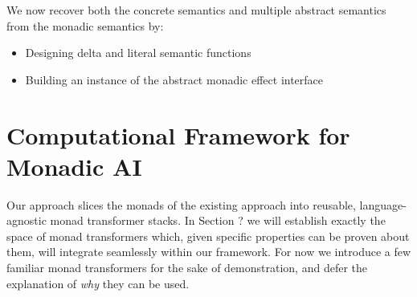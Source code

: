\documentclass{article}
\begin{document}
We now recover both the concrete semantics and multiple abstract semantics from
the monadic semantics by:
%
\begin{itemize}
  \item Designing delta and literal semantic functions
  \item Building an instance of the abstract monadic effect interface
\end{itemize}


\section{Computational Framework for Monadic AI}
\label{section:computational}
Our approach slices the monads of the existing approach into reusable,
language-agnostic monad transformer stacks.
%
In Section ? we will establish exactly the space of monad transformers which,
given specific properties can be proven about them, will integrate seamlessly
within our framework.  For now we introduce a few familiar monad transformers
for the sake of demonstration, and defer the explanation of \textit{why} they
can be used.
\end{document}
